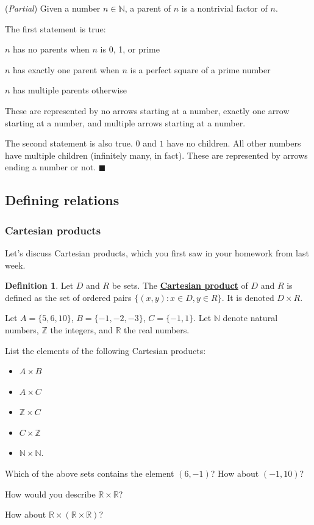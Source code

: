 \documentclass[11pt]{article}
\newenvironment{task}
	{\begin{mdframed}[linecolor=lightgray, linewidth=3pt]\raggedright}
	{\end{mdframed}}
\newcommand{\R}{\mathbb{R}}
\newcommand{\N}{\mathbb{N}}
\newcommand{\Z}{\mathbb{Z}}
\newcommand\st{:}
\renewcommand\emph[1]{\underline{\bf{#1}}} %
\theoremstyle{definition}
\newtheorem{definition}[theorem]{Definition}
\newenvironment{solution}{{\it Solution.} }{\hfill {\color{lightgray}$\blacksquare$}}
\begin{document}
\begin{solution}({\it Partial})
Given a number $n\in \N$, a parent of $n$ is a nontrivial factor of $n$.

The first statement is true: 

\vspace*{-8pt}
\begin{itemize*}
	\item $n$ has no parents when $n$ is 0, 1, or prime \\ 
	\item $n$ has exactly one parent when $n$ is a perfect square of a prime number \\
	\item $n$ has multiple parents otherwise
\end{itemize*}
\vspace*{-8pt}
These are represented by no arrows starting at a number, exactly one arrow starting at a number, and multiple arrows starting at a number.

The second statement is also true. $0$ and $1$ have no children. All other numbers have multiple children (infinitely many, in fact). These are represented by arrows ending a number or not.
\end{solution}


\subsection{Defining relations}
\subsubsection{Cartesian products}
Let's discuss Cartesian products, which you first saw in your homework from last week.

\begin{definition}\label{d: cartesian product}
Let $D$ and $R$ be sets. The \emph{Cartesian product} of $D$ and $R$ is defined as the set of ordered pairs $\{ (x,y) \st x\in D, y\in R\}$. It is denoted $D\times R$.
\end{definition}

\begin{task}
Let $A=\{5, 6, 10\}$, $B=\{-1, -2, -3\}$, $C=\{-1,1\}$. Let $\N$ denote natural numbers, $\Z$ the integers,  and $\R$ the real numbers.

List the elements of the following Cartesian products:
	\begin{itemize}
	\item $A\times B$ 
	\item $A\times C$
	\item $\Z \times C$
	\item $C\times \Z$
	\item $\N \times \N$.
	\end{itemize}

Which of the above sets contains the element $(6, -1)$? How about $(-1, 10)$?

How would you describe $\R\times \R$? 

How about $\R\times (\R\times \R)$?
\end{task}
\end{document}

